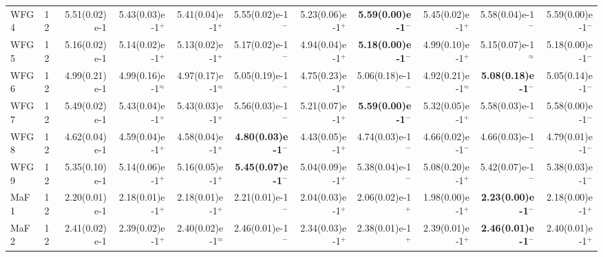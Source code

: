 \documentclass[pdflatex,sn-mathphys-ay]{sn-jnl}%
\theoremstyle{thmstyleone}%
\theoremstyle{thmstyletwo}%
\theoremstyle{thmstylethree}%
\begin{document}
\begin{landscape}
{\begin{longtable}{llrrrrrrrrr}
			WFG4                              & 12  & 5.51(0.02)e-1          & 5.43(0.03)e-1$^{+}$       & 5.41(0.04)e-1$^{+}$       & 5.55(0.02)e-1$^{-}$          & 5.23(0.06)e-1$^{+}$       & \textbf{5.59(0.00)e-1}$^{-}$ & 5.45(0.02)e-1$^{+}$       & 5.58(0.04)e-1$^{-}$          & 5.59(0.00)e-1$^{-}$          \\
			WFG5                              & 12  & 5.16(0.02)e-1          & 5.14(0.02)e-1$^{+}$       & 5.13(0.02)e-1$^{+}$       & 5.17(0.02)e-1$^{-}$          & 4.94(0.04)e-1$^{+}$       & \textbf{5.18(0.00)e-1}$^{-}$ & 4.99(0.10)e-1$^{+}$       & 5.15(0.07)e-1$^{\approx}$    & 5.18(0.00)e-1$^{-}$          \\
			WFG6                              & 12  & 4.99(0.21)e-1          & 4.99(0.16)e-1$^{\approx}$ & 4.97(0.17)e-1$^{\approx}$ & 5.05(0.19)e-1$^{-}$          & 4.75(0.23)e-1$^{+}$       & 5.06(0.18)e-1$^{-}$          & 4.92(0.21)e-1$^{\approx}$ & \textbf{5.08(0.18)e-1}$^{-}$ & 5.05(0.14)e-1$^{-}$          \\
			WFG7                              & 12  & 5.49(0.02)e-1          & 5.43(0.04)e-1$^{+}$       & 5.43(0.03)e-1$^{+}$       & 5.56(0.03)e-1$^{-}$          & 5.21(0.07)e-1$^{+}$       & \textbf{5.59(0.00)e-1}$^{-}$ & 5.32(0.05)e-1$^{+}$       & 5.58(0.03)e-1$^{-}$          & 5.58(0.00)e-1$^{-}$          \\
			WFG8                              & 12  & 4.62(0.04)e-1          & 4.59(0.04)e-1$^{+}$       & 4.58(0.04)e-1$^{+}$       & \textbf{4.80(0.03)e-1}$^{-}$ & 4.43(0.05)e-1$^{+}$       & 4.74(0.03)e-1$^{-}$          & 4.66(0.02)e-1$^{-}$       & 4.66(0.03)e-1$^{-}$          & 4.79(0.01)e-1$^{-}$          \\
			WFG9                              & 12  & 5.35(0.10)e-1          & 5.14(0.06)e-1$^{+}$       & 5.16(0.05)e-1$^{+}$       & \textbf{5.45(0.07)e-1}$^{-}$ & 5.04(0.09)e-1$^{+}$       & 5.38(0.04)e-1$^{-}$          & 5.08(0.20)e-1$^{+}$       & 5.42(0.07)e-1$^{-}$          & 5.38(0.03)e-1$^{-}$          \\
			\midrule
			MaF1                              & 12  & 2.20(0.01)e-1          & 2.18(0.01)e-1$^{+}$       & 2.18(0.01)e-1$^{+}$       & 2.21(0.01)e-1$^{-}$          & 2.04(0.03)e-1$^{+}$       & 2.06(0.02)e-1$^{+}$          & 1.98(0.00)e-1$^{+}$       & \textbf{2.23(0.00)e-1}$^{-}$ & 2.18(0.00)e-1$^{+}$          \\
			MaF2                              & 12  & 2.41(0.02)e-1          & 2.39(0.02)e-1$^{+}$       & 2.40(0.02)e-1$^{\approx}$ & 2.46(0.01)e-1$^{-}$          & 2.34(0.03)e-1$^{+}$       & 2.38(0.01)e-1$^{+}$          & 2.39(0.01)e-1$^{+}$       & \textbf{2.46(0.01)e-1}$^{-}$ & 2.40(0.01)e-1$^{+}$          \\

\end{longtable}}
\end{landscape}
\end{document}
